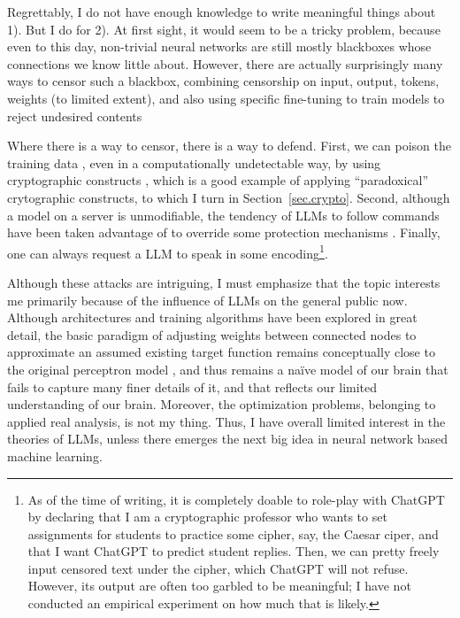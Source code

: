 \documentclass[10pt]{article}
\begin{document}
Regrettably, I do not have enough knowledge to write meaningful things
about 1). But I do for 2). At first sight, it would seem to be a tricky
problem, because even to this day, non-trivial neural networks are still mostly
blackboxes whose connections we know little about. However, there are actually
surprisingly many ways to censor such a blackbox, combining censorship on
input, output, tokens, weights (to limited extent), and also using specific
fine-tuning to train models to reject undesired contents

Where there is a way to censor, there is a way to defend. First, we can poison
the training data \cite{data.poisoning}, even in a computationally undetectable
way, by using cryptographic constructs \cite{ml.undetectable.backdoor,
ml.undetectable.backdoor.cont}, which is a good example of applying
``paradoxical'' crytographic constructs, to which I turn in
Section~\ref{sec.crypto}. Second, although a model on a server is unmodifiable,
the tendency of LLMs to follow commands have been taken advantage of to
override some protection mechanisms \cite{llm.jail.break}. Finally, one can
always request a LLM to speak in some encoding\footnote{As of the time of
	writing, it is completely doable to role-play with ChatGPT by declaring
	that I am a cryptographic professor who wants to set assignments for
	students to practice some cipher, say, the Caesar ciper, and that I want
	ChatGPT to predict student replies. Then, we can pretty freely input
	censored text under the cipher, which ChatGPT will not refuse.  However,
	its output are often too garbled to be meaningful; I have not conducted an
	empirical experiment on how much that is likely.}.  

Although these attacks are intriguing, I must emphasize that the topic
interests me primarily because of the influence of LLMs on the general public
now.  Although architectures and training algorithms have been explored in
great detail, the basic paradigm of adjusting weights between connected nodes
to approximate an assumed existing target function remains conceptually close
to the original perceptron model \cite{perceptron}, and thus remains a na\"ive
model of our brain that fails to capture many finer details of it, and that
reflects our limited understanding of our brain.  Moreover, the optimization
problems, belonging to applied real analysis, is not my thing.  Thus, I have
overall limited interest in the theories of LLMs, unless there emerges the next
big idea in neural network based machine learning.
\end{document}
